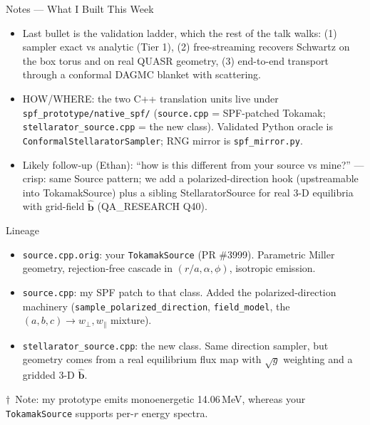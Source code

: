\documentclass[11pt,aspectratio=169]{beamer}
\newcommand{\bhat}{\hat{\mathbf{b}}}
\newcommand{\notefoot}[1]{\vfill{\footnotesize #1\par}}
\begin{document}
\begin{frame}[allowframebreaks]{Notes --- What I Built This Week}
{\begin{itemize}
\item Last bullet is the validation ladder, which the rest of the talk walks: (1) sampler exact
      vs analytic (Tier 1), (2) free-streaming recovers Schwartz on the box torus and on real
      QUASR geometry, (3) end-to-end transport through a conformal DAGMC blanket with scattering.
\item HOW/WHERE: the two C++ translation units live under
      \texttt{spf\_prototype/native\_spf/} (\texttt{source.cpp} = SPF-patched Tokamak;
      \texttt{stellarator\_source.cpp} = the new class). Validated Python oracle is
      \texttt{ConformalStellaratorSampler}; RNG mirror is \texttt{spf\_mirror.py}.
\item Likely follow-up (Ethan): ``how is this different from your source vs mine?'' --- crisp:
      same Source pattern; we add a polarized-direction hook (upstreamable into TokamakSource)
      plus a sibling StellaratorSource for real 3-D equilibria with grid-field $\bhat$
      (QA\_RESEARCH Q40).
\end{itemize}
}
\end{frame}

\begin{frame}{Lineage}
\begin{itemize}
\item \texttt{source.cpp.orig}: your \texttt{TokamakSource} (PR \#3999). Parametric
      Miller geometry, rejection-free cascade in $(r/a,\alpha,\phi)$, isotropic emission.
\item \texttt{source.cpp}: my SPF patch to that class. Added the polarized-direction
      machinery (\texttt{sample\_polarized\_direction}, \texttt{field\_model}, the
      $(a,b,c)\!\to\!w_\perp,w_\parallel$ mixture).
\item \texttt{stellarator\_source.cpp}: the new class. Same direction sampler, but geometry
      comes from a real equilibrium flux map with $\sqrt{g}$ weighting and a gridded 3-D
      $\bhat$.
\end{itemize}
\notefoot{$\dagger$~Note: my prototype emits monoenergetic 14.06\,MeV, whereas your
\texttt{TokamakSource} supports per-$r$ energy spectra.}
\end{frame}
\end{document}
